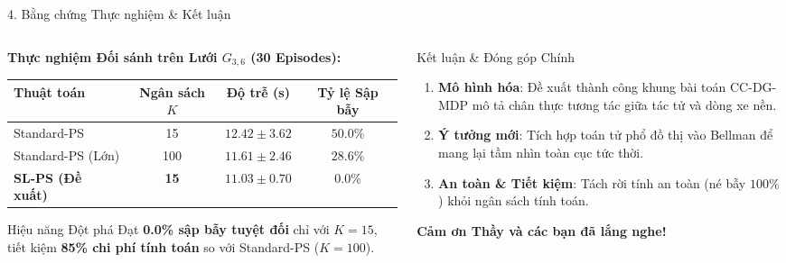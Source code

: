 \documentclass[aspectratio=169, 10pt]{beamer}
\begin{document}
\begin{frame}{4. Bằng chứng Thực nghiệm \& Kết luận}
    \begin{columns}[T]
        \begin{column}{0.50\textwidth}
            \textbf{Thực nghiệm Đối sánh trên Lưới $G_{3,6}$ (30 Episodes):}
            \begin{table}[h]
                \centering
                \small
                \begin{tabular}{lccc}
                    \toprule
                    \textbf{Thuật toán} & \textbf{Ngân sách $K$} & \textbf{Độ trễ (s)} & \textbf{Tỷ lệ Sập bẫy} \\
                    \midrule
                    Standard-PS & 15 & $12.42 \pm 3.62$ & $50.0\%$ \\
                    Standard-PS (Lớn) & 100 & $11.61 \pm 2.46$ & $28.6\%$ \\
                    \midrule
                    \textbf{SL-PS (Đề xuất)} & \textbf{15} & $\mathbf{11.03 \pm 0.70}$ & $\mathbf{0.0\%}$ \\
                    \bottomrule
                \end{tabular}
            \end{table}
            
            \begin{exampleblock}{Hiệu năng Đột phá}
                Đạt \textbf{0.0\% sập bẫy tuyệt đối} chỉ với $K=15$, tiết kiệm \textbf{85\% chi phí tính toán} so với Standard-PS ($K=100$).
            \end{exampleblock}
        \end{column}
        
        \begin{column}{0.48\textwidth}
            \begin{block}{Kết luận \& Đóng góp Chính}
                \begin{enumerate}
                    \item \textbf{Mô hình hóa}: Đề xuất thành công khung bài toán CC-DG-MDP mô tả chân thực tương tác giữa tác tử và dòng xe nền.
                    \item \textbf{Ý tưởng mới}: Tích hợp toán tử phổ đồ thị vào Bellman để mang lại tầm nhìn toàn cục tức thời.
                    \item \textbf{An toàn \& Tiết kiệm}: Tách rời tính an toàn (né bẫy $100\%$) khỏi ngân sách tính toán.
                \end{enumerate}
            \end{block}
            
            \vspace{0.1cm}
            \centering
            \textbf{\large Cảm ơn Thầy và các bạn đã lắng nghe!}
        \end{column}
    \end{columns}
\end{frame}
\end{document}
